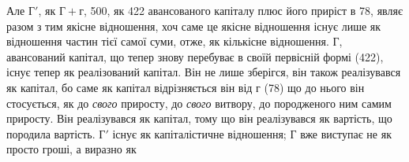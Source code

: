 Але $Г'$, як $Г + г$, 500, як 422 авансованого капіталу
плюс його приріст в 78, являє разом з тим якісне відношення,
хоч саме це якісне відношення існує лише як відношення частин тієї
самої суми, отже, як кількісне відношення. $Г$, авансований капітал, що
тепер знову перебуває в своїй первісній формі (422), існує
тепер як реалізований капітал. Він не лише зберігся, він також реалізувався
як капітал, бо саме як капітал відрізняється він від г (78)
що до нього він стосується, як до \emph{свого} приросту, до \emph{свого} витвору, до
породженого ним самим приросту. Він реалізувався як капітал, тому що
він реалізувався як вартість, що породила вартість. $Г'$ існує як капіталістичне
відношення; Г вже виступає не як просто гроші, а виразно як
\parbreak{}  %

